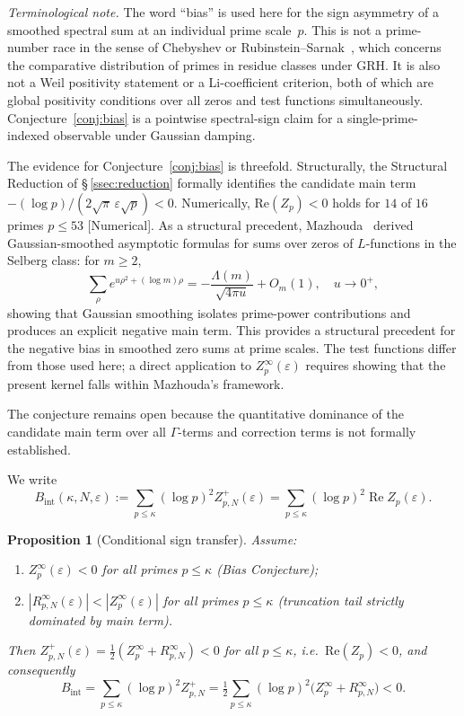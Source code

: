 \documentclass[11pt]{article}
\newtheorem{proposition}[theorem]{Proposition}
\begin{document}
\noindent
\textit{Terminological note.}
The word ``bias'' is used here for the sign asymmetry of a smoothed
spectral sum at an individual prime scale~$p$.
This is not a prime-number race in the sense of Chebyshev or
Rubinstein--Sarnak~\cite{RubinsteinSarnak}, which concerns the
comparative distribution of primes in residue classes under GRH.
It is also not a Weil positivity statement or a Li-coefficient
criterion, both of which are global positivity conditions over all
zeros and test functions simultaneously.
Conjecture~\ref{conj:bias} is a pointwise spectral-sign claim for
a single-prime-indexed observable under Gaussian damping.

The evidence for Conjecture~\ref{conj:bias} is threefold.
Structurally, the Structural Reduction of \S\,\ref{ssec:reduction}
formally identifies the candidate main term
$-(\log p)/(2\sqrt{\pi}\,\varepsilon\sqrt{p})<0$.
Numerically, $\mathrm{Re}(Z_p)<0$ holds for $14$ of $16$ primes
$p\leq 53$ [Numerical].
As a structural precedent, Mazhouda~\cite{Mazhouda} derived
Gaussian-smoothed asymptotic formulas for sums over zeros of
$L$-functions in the Selberg class: for $m\geq 2$,
\[
\sum_\rho e^{u\rho^2+(\log m)\rho}
  = -\frac{\Lambda(m)}{\sqrt{4\pi u}} + O_m(1), \quad u\to 0^+,
\]
showing that Gaussian smoothing isolates prime-power contributions
and produces an explicit negative main term.
This provides a structural precedent for the negative bias in smoothed
zero sums at prime scales.
The test functions differ from those used here; a direct application
to $Z_p^\infty(\varepsilon)$ requires showing that the present
kernel falls within Mazhouda's framework.

The conjecture remains open because the quantitative dominance of the
candidate main term over all $\Gamma$-terms and correction terms is
not formally established.

We write
\[
B_{\mathrm{int}}(\kappa,N,\varepsilon)
:=\sum_{p\le\kappa}(\log p)^2 Z_{p,N}^+(\varepsilon)
=\sum_{p\le\kappa}(\log p)^2\operatorname{Re}Z_p(\varepsilon).
\]

\begin{proposition}[Conditional sign transfer]
\label{prop:sign}
Assume:
\begin{enumerate}[label=\textup{(\Alph*)}]
\item $Z_p^\infty(\varepsilon)<0$ for all primes $p\leq\kappa$
  \textup{(Bias Conjecture)};
\item $|R_{p,N}^{\infty}(\varepsilon)|
  < |Z_p^\infty(\varepsilon)|$
  for all primes $p\leq\kappa$
  \textup{(truncation tail strictly dominated by main term)}.
\end{enumerate}
Then $Z_{p,N}^+(\varepsilon) = \tfrac{1}{2}(Z_p^\infty + R_{p,N}^\infty) < 0$
for all $p\leq\kappa$, i.e.\ $\mathrm{Re}(Z_p)<0$,
and consequently
\[
B_{\mathrm{int}}
= \sum_{p\leq\kappa}(\log p)^2 Z_{p,N}^+
 = \tfrac{1}{2}\sum_{p\leq\kappa}(\log p)^2
   \bigl(Z_p^\infty + R_{p,N}^\infty\bigr)
< 0.
\]
\end{proposition}
\end{document}
